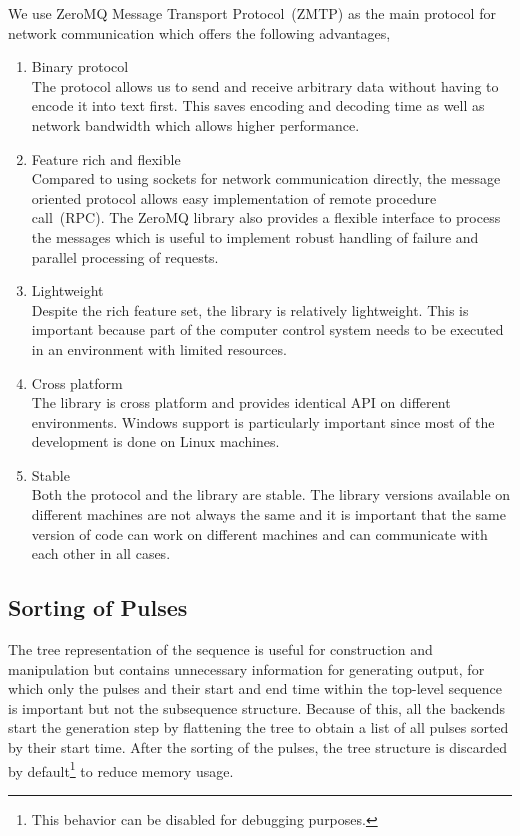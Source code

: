 We use ZeroMQ Message Transport Protocol~(ZMTP) as the main protocol for network communication
which offers the following advantages,
\begin{enumerate}
\item Binary protocol\\
  The protocol allows us to send and receive arbitrary data without having to encode it
  into text first. This saves encoding and decoding time as well as network bandwidth
  which allows higher performance.
\item Feature rich and flexible\\
  Compared to using sockets for network communication directly,
  the message oriented protocol allows easy implementation of remote procedure call~(RPC).
  The ZeroMQ library also provides a flexible interface to process the messages
  which is useful to implement robust handling of failure
  and parallel processing of requests.
\item Lightweight\\
  Despite the rich feature set, the library is relatively lightweight.
  This is important because part of the computer control system
  needs to be executed in an environment with limited resources.
\item Cross platform\\
  The library is cross platform and provides identical API on different environments.
  Windows support is particularly important since most of the development is done
  on Linux machines.
\item Stable\\
  Both the protocol and the library are stable.
  The library versions available on different machines are not always the same
  and it is important that the same version of code can work on different machines
  and can communicate with each other in all cases.
\end{enumerate}

\subsection{Sorting of Pulses}
\label{ch:computer-control:backend:sort-pulse}
The tree representation of the sequence is useful for construction and manipulation
but contains unnecessary information for generating output,
for which only the pulses and their start and end time
within the top-level sequence is important but not the subsequence structure.
Because of this, all the backends start the generation step by
flattening the tree to obtain a list of all pulses sorted by their start time.
After the sorting of the pulses, the tree structure is discarded by default\footnote{
  This behavior can be disabled for debugging purposes.} to reduce memory usage.

